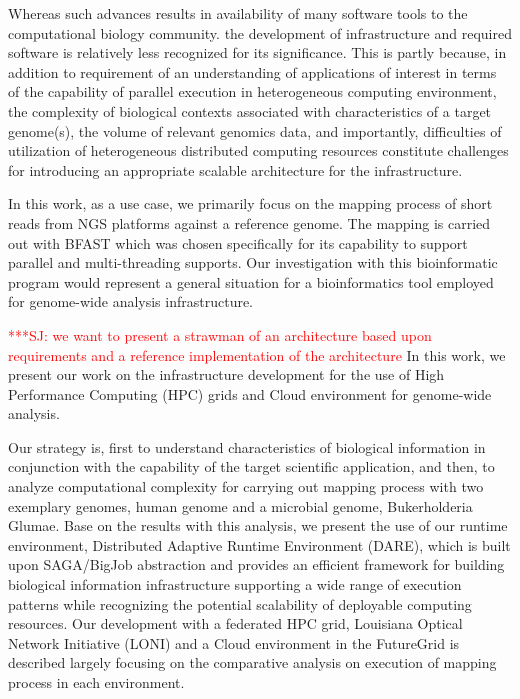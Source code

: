 \documentclass[12pt]{article}
\newcommand{\jhanote}[1]{ {\textcolor{red}     {***SJ: #1}}}
\newcommand{\jhanote}[1]{}
\begin{document}
Whereas such advances results in availability of many software tools to the computational biology community. the development of
infrastructure and required software is relatively less recognized for its significance.  This is partly because, in addition to requirement of an understanding of applications of interest in terms of the capability of parallel execution in heterogeneous computing environment, the complexity of biological contexts associated with characteristics of a target genome(s), the volume of relevant genomics data, and importantly, difficulties of utilization of heterogeneous distributed computing resources constitute challenges for introducing an appropriate scalable architecture for the infrastructure.

In this work, as a use case, we primarily focus on the mapping process of short reads from NGS platforms against a reference genome.  The mapping is carried out with BFAST which was chosen specifically for its capability to support parallel and multi-threading supports.  Our investigation with this bioinformatic program would represent a general situation for a bioinformatics tool employed for genome-wide analysis infrastructure.

\jhanote{we want to present a strawman of an architecture based upon
  requirements and a reference implementation of the architecture} In
this work, we present our work on the infrastructure development for
the use of High Performance Computing (HPC) grids and Cloud
environment for genome-wide analysis.

Our strategy is, first to understand characteristics of biological information in conjunction with the capability of the target scientific application, and then, to analyze computational complexity for carrying out mapping process with two exemplary genomes, human genome and a microbial genome, Bukerholderia Glumae.  Base on the results with this analysis, we present the use of our runtime environment, Distributed Adaptive Runtime Environment (DARE), which is built upon SAGA/BigJob abstraction and provides an efficient framework for building biological information infrastructure supporting a wide range of execution patterns while recognizing the potential scalability of deployable computing resources.  Our development with a federated HPC grid, Louisiana Optical Network Initiative (LONI) and a Cloud environment in the FutureGrid is described largely focusing on the comparative analysis on execution of mapping process in each environment. 
\end{document}
